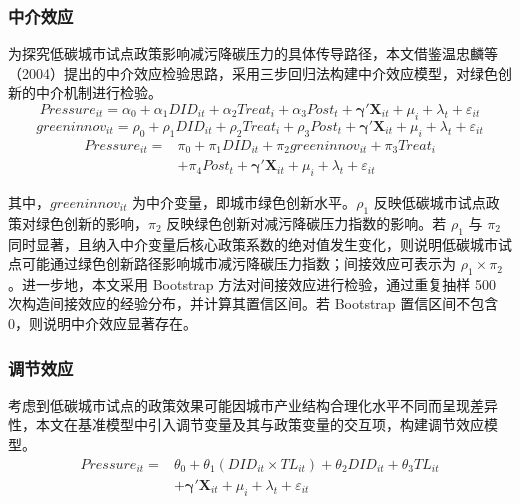 \documentclass[12pt,a4paper]{ctexart}
\begin{document}
\subsubsection{中介效应}

为探究低碳城市试点政策影响减污降碳压力的具体传导路径，本文借鉴温忠麟等（2004）提出的中介效应检验思路，采用三步回归法构建中介效应模型，对绿色创新的中介机制进行检验。
\begin{equation}
Pressure_{it}=\alpha_0+\alpha_1 DID_{it}+\alpha_2 Treat_i+\alpha_3 Post_t+\boldsymbol{\gamma}'\mathbf{X}_{it}+\mu_i+\lambda_t+\varepsilon_{it}
\end{equation}
\begin{equation}
greeninnov_{it}=\rho_0+\rho_1 DID_{it}+\rho_2 Treat_i+\rho_3 Post_t+\boldsymbol{\gamma}'\mathbf{X}_{it}+\mu_i+\lambda_t+\varepsilon_{it}
\end{equation}
\begin{equation}
\begin{split}
Pressure_{it}={}&\pi_0+\pi_1 DID_{it}+\pi_2 greeninnov_{it}+\pi_3 Treat_i \\
&+\pi_4 Post_t+\boldsymbol{\gamma}'\mathbf{X}_{it}
+\mu_i+\lambda_t+\varepsilon_{it}
\end{split}
\end{equation}

其中，$greeninnov_{it}$ 为中介变量，即城市绿色创新水平。$\rho_1$ 反映低碳城市试点政策对绿色创新的影响，$\pi_2$ 反映绿色创新对减污降碳压力指数的影响。若 $\rho_1$ 与 $\pi_2$ 同时显著，且纳入中介变量后核心政策系数的绝对值发生变化，则说明低碳城市试点可能通过绿色创新路径影响城市减污降碳压力指数；间接效应可表示为 $\rho_1\times\pi_2$。进一步地，本文采用 Bootstrap 方法对间接效应进行检验，通过重复抽样 500 次构造间接效应的经验分布，并计算其置信区间。若 Bootstrap 置信区间不包含0，则说明中介效应显著存在。

\subsubsection{调节效应}

考虑到低碳城市试点的政策效果可能因城市产业结构合理化水平不同而呈现差异性，本文在基准模型中引入调节变量及其与政策变量的交互项，构建调节效应模型。
\begin{equation}
\begin{split}
Pressure_{it}={}&\theta_0+\theta_1(DID_{it}\times TL_{it})+\theta_2 DID_{it}+\theta_3 TL_{it} \\
&+\boldsymbol{\gamma}'\mathbf{X}_{it}+\mu_i+\lambda_t+\varepsilon_{it}
\end{split}
\end{equation}
\end{document}
